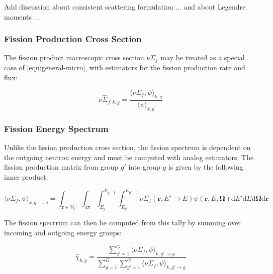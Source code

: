 Add discussion about consistent scattering formulation ... and about Legendre moments ...

\subsubsection{Fission Production Cross Section}
\label{subsubsec:tally-types-fiss-prod}

The fission product macroscopic cross section $\nu\Sigma_{f}$ may be treated as a special case of \autoref{eqn:general-micro}, with estimators for the fission production rate and flux:

\begin{equation}
\label{eqn:nu-fiss-macro}
\nu\hat{\Sigma}_{f,k,g} = \frac{\langle \nu\Sigma_{f}, \psi \rangle_{k,g}}{\langle \psi \rangle_{k,g}}
\end{equation}

\subsubsection{Fission Energy Spectrum}
\label{subsubsec:tally-types-chi}

Unlike the fission production cross section, the fission spectrum is dependent on the outgoing neutron energy and must be computed with analog estimators. The fission production matrix from group $g'$ into group $g$ is given by the following inner product:

\begin{equation}
\label{eqn:nu-fiss-energies}
\langle \nu\Sigma_{f}, \psi \rangle_{k,g'\rightarrow g} = \int_{\mathbf{r} \in V_{k}} \int_{4\pi} \int_{E_{g}}^{E_{g-1}} \int_{E_{g'}}^{E_{g'-1}} \nu\Sigma_{f}(\mathbf{r},E'\rightarrow E)\psi(\mathbf{r},E,\mathbf{\Omega}) \mathrm{d}E'\mathrm{d}E\mathrm{d}\mathbf{\Omega}\mathrm{d}\mathbf{r}
\end{equation}

\noindent The fission spectrum can then be computed from this tally by summing over incoming and outgoing energy groups:

\begin{equation}
\label{eqn:chi}
\hat{\chi}_{k,g} = \frac{\displaystyle\sum\limits_{g'=1}^{G} \langle \nu\Sigma_{f}, \psi \rangle_{k,g'\rightarrow g}}{\displaystyle\sum\limits_{g=1}^{G} \displaystyle\sum\limits_{g'=1}^{G} \langle \nu\Sigma_{f}, \psi \rangle_{k,g'\rightarrow g}}
\end{equation}

